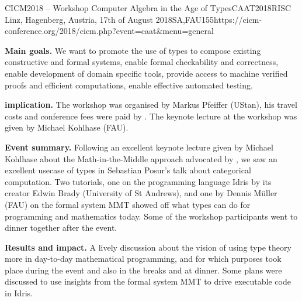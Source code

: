 \begin{event}{CICM2018 -- Workshop Computer Algebra in the Age of Types}{CAAT2018}{RISC Linz, Hagenberg, Austria, 17th of August 2018}{SA,FAU}{15}{5}{https://cicm-conference.org/2018/cicm.php?event=caat&menu=general}

\textbf{Main goals.} We want to promote the use of types to compose existing
constructive and formal systems, enable formal checkability and correctness,
enable development of domain specific tools, provide access to machine verified
proofs and efficient computations, enable effective automated testing.

\textbf{\ODK implication.} The workshop was organised by Markus Pfeiffer (UStan), his
travel costs and conference fees were paid by \ODK. The keynote lecture at the
workshop was given by Michael Kohlhase (FAU).

\textbf{Event summary.} Following an excellent keynote lecture given by Michael
Kohlhase about the Math-in-the-Middle approach advocated by \ODK, we saw an
excellent usecase of types in Sebastian Posur's talk about categorical
computation. Two tutorials, one on the programming language Idris by its creator
Edwin Brady (University of St Andrews), and one by Dennis Müller (FAU) on the
formal system MMT showed off what types can do for programming and mathematics
today.
Some of the workshop participants went to dinner together after the event.

\textbf{Results and impact.} A lively discussion about the vision of using type
theory more in day-to-day mathematical programming, and for which purposes took
place during the event and also in the breaks and at dinner.
Some plans were discussed to use insights from the formal system MMT to drive
executable code in Idris.

\end{event}
